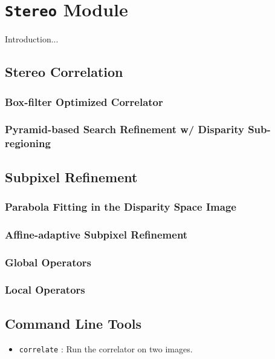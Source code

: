 \chapter{{\tt Stereo} Module}\label{ch:stereo-module}

Introduction...

\section{Stereo Correlation}
\label{sec:stereo_correlation}

\subsection{Box-filter Optimized Correlator}

\subsection{Pyramid-based Search Refinement w/ Disparity Sub-regioning}


\section{Subpixel Refinement}
\label{sec:subpixel_refinement}

\subsection{Parabola Fitting in the Disparity Space Image}

\subsection{Affine-adaptive Subpixel Refinement}

\subsection{Global Operators}

\subsection{Local Operators}

\section{Command Line Tools}


\begin{itemize}
\item \verb#correlate#   : Run the correlator on two images.
\end{itemize}



\begin{thebibliography}{1}

\end{thebibliography}
